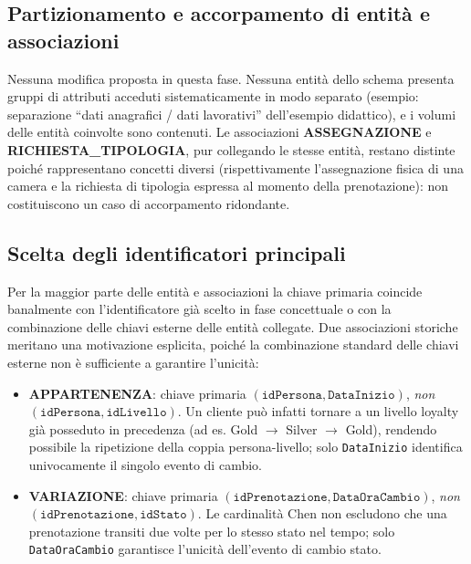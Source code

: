 \documentclass[a4paper,12pt]{report}
\begin{document}
\subsection{Partizionamento e accorpamento di entità e associazioni}

Nessuna modifica proposta in questa fase. Nessuna entità dello schema
presenta gruppi di attributi acceduti sistematicamente in modo separato
(esempio: separazione ``dati anagrafici / dati
lavorativi'' dell'esempio didattico), e i volumi delle entità coinvolte
sono contenuti. Le associazioni \textbf{ASSEGNAZIONE} e
\textbf{RICHIESTA\_TIPOLOGIA}, pur collegando le stesse entità, restano
distinte poiché rappresentano concetti diversi (rispettivamente
l'assegnazione fisica di una camera e la richiesta di tipologia espressa
al momento della prenotazione): non costituiscono un caso di accorpamento
ridondante.

\subsection{Scelta degli identificatori principali}

Per la maggior parte delle entità e associazioni la chiave primaria
coincide banalmente con l'identificatore già scelto in fase concettuale o
con la combinazione delle chiavi esterne delle entità collegate. Due
associazioni storiche meritano una motivazione esplicita, poiché la
combinazione standard delle chiavi esterne non è sufficiente a garantire
l'unicità:

\begin{itemize}
    \item \textbf{APPARTENENZA}: chiave primaria
          $(\texttt{idPersona}, \texttt{DataInizio})$,
          \newline
          \emph{non} $(\texttt{idPersona}, \texttt{idLivello})$. Un cliente può
          infatti tornare a un livello loyalty già posseduto in
          precedenza (ad es. Gold $\to$ Silver $\to$ Gold), rendendo
          possibile la ripetizione della coppia persona-livello; solo
          \texttt{DataInizio} identifica univocamente il singolo evento
          di cambio.
    \item \textbf{VARIAZIONE}: chiave primaria
          $(\texttt{idPrenotazione}, \texttt{DataOraCambio})$,
          \newline
          \emph{non} $(\texttt{idPrenotazione}, \texttt{idStato})$. Le
          cardinalità Chen non escludono che una prenotazione transiti
          due volte per lo stesso stato nel tempo; solo
          \texttt{DataOraCambio} garantisce l'unicità dell'evento di
          cambio stato.
\end{itemize}
\end{document}
